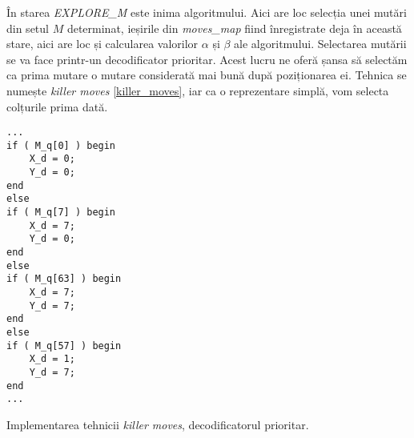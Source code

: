 \documentclass[12pt,twoside,a4paper,fleqn]{book}
\theoremstyle{definition}
\begin{document}
În starea \emph{EXPLORE\_M} este inima algoritmului. Aici are loc selecția unei mutări din setul $M$ determinat, ieșirile din \emph{moves\_map} fiind înregistrate deja în această stare, aici are loc și calcularea valorilor $\alpha$ și $\beta$ ale algoritmului. Selectarea mutării se va face printr-un decodificator prioritar. Acest lucru ne oferă șansa să selectăm ca prima mutare o mutare considerată mai bună după poziționarea ei. Tehnica se numește \emph{killer moves} \ref{killer_moves}, iar ca o reprezentare simplă, vom selecta colțurile prima dată.\cite{othello_fang, othello_master} 
\begin{fragmentsursa}
\begin{scriptsize}
\begin{verbatim}
...
if ( M_q[0] ) begin
    X_d = 0;
    Y_d = 0;
end
else
if ( M_q[7] ) begin
    X_d = 7;
    Y_d = 0;
end
else
if ( M_q[63] ) begin
    X_d = 7;
    Y_d = 7;
end
else
if ( M_q[57] ) begin
    X_d = 1;
    Y_d = 7;
end
...
\end{verbatim}
\end{scriptsize}
\caption{Implementarea tehnicii \emph{killer moves}, decodificatorul prioritar.}
\label{frag_killer}
\end{fragmentsursa}
\end{document}
